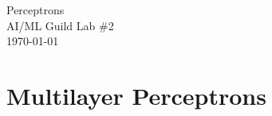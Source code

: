 \documentclass[letterpaper,12pt]{article}
\begin{document}
\begin{flushleft}
    Perceptrons\\
    AI/ML Guild Lab \#2\\
    \today \\
\end{flushleft}

\section{Multilayer Perceptrons}
\end{document}
